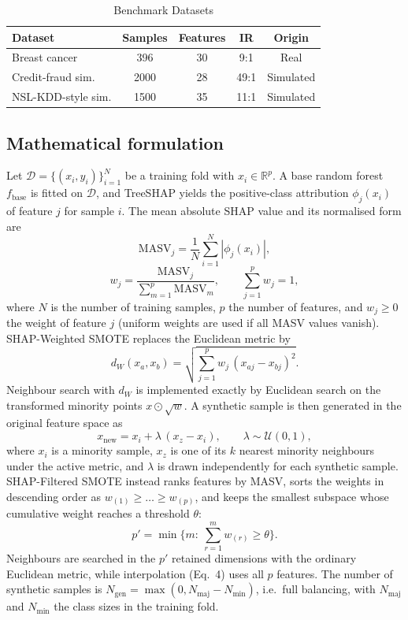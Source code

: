 \documentclass[conference]{IEEEtran}
\begin{document}
\begin{table}[t]
\caption{Benchmark Datasets}
\label{tab:data}
\centering
\small
\begin{tabular}{lcccc}
\toprule
\textbf{Dataset} & \textbf{Samples} & \textbf{Features} & \textbf{IR} & \textbf{Origin} \\
\midrule
Breast cancer & 396 & 30 & 9:1 & Real \\
Credit-fraud sim. & 2000 & 28 & 49:1 & Simulated \\
NSL-KDD-style sim. & 1500 & 35 & 11:1 & Simulated \\
\bottomrule
\end{tabular}
\end{table}

\subsection{Mathematical formulation}
Let $\mathcal{D}=\{(x_i,y_i)\}_{i=1}^{N}$ be a training fold with $x_i\in\mathbb{R}^p$. A base random forest $f_{\text{base}}$ is fitted on $\mathcal{D}$, and TreeSHAP yields the positive-class attribution $\phi_j(x_i)$ of feature $j$ for sample $i$. The mean absolute SHAP value and its normalised form are
\begin{equation}
\mathrm{MASV}_j=\frac{1}{N}\sum_{i=1}^{N}\left|\phi_j(x_i)\right|,
\end{equation}
\begin{equation}
w_j=\frac{\mathrm{MASV}_j}{\sum_{m=1}^{p}\mathrm{MASV}_m},\qquad \sum_{j=1}^{p}w_j=1,
\end{equation}
where $N$ is the number of training samples, $p$ the number of features, and $w_j\ge 0$ the weight of feature $j$ (uniform weights are used if all MASV values vanish). SHAP-Weighted SMOTE replaces the Euclidean metric by
\begin{equation}
d_W(x_a,x_b)=\sqrt{\sum_{j=1}^{p}w_j\,(x_{aj}-x_{bj})^2}.
\end{equation}
Neighbour search with $d_W$ is implemented exactly by Euclidean search on the transformed minority points $x\odot\sqrt{w}$. A synthetic sample is then generated in the original feature space as
\begin{equation}
x_{\text{new}}=x_i+\lambda\,(x_{z}-x_i),\qquad \lambda\sim\mathcal{U}(0,1),
\end{equation}
where $x_i$ is a minority sample, $x_z$ is one of its $k$ nearest minority neighbours under the active metric, and $\lambda$ is drawn independently for each synthetic sample. SHAP-Filtered SMOTE instead ranks features by MASV, sorts the weights in descending order as $w_{(1)}\ge\dots\ge w_{(p)}$, and keeps the smallest subspace whose cumulative weight reaches a threshold $\theta$:
\begin{equation}
p'=\min\Big\{m:\ \sum_{r=1}^{m}w_{(r)}\ge\theta\Big\}.
\end{equation}
Neighbours are searched in the $p'$ retained dimensions with the ordinary Euclidean metric, while interpolation (Eq.~4) uses all $p$ features. The number of synthetic samples is $N_{\text{gen}}=\max(0,N_{\text{maj}}-N_{\text{min}})$, i.e.\ full balancing, with $N_{\text{maj}}$ and $N_{\text{min}}$ the class sizes in the training fold.
\end{document}
